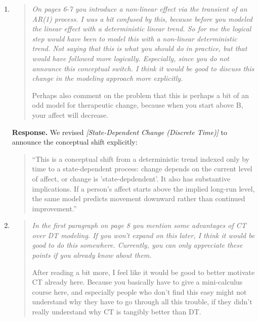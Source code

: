 \documentclass[11pt]{article}
\newcommand{\response}{\textbf{Response.} }
\newcommand{\secit}[1]{\textit{[#1]}}
\newcommand{\msq}[1]{\begin{quote}\small\noindent``#1''\end{quote}}
\newenvironment{reviewerpoint}{\begin{quote}\itshape}{\end{quote}}
\begin{document}
\begin{enumerate}[label=\textbf{Reviewer 1, Minor Point \arabic*.}]
\response We revised the wording in \secit{State-Dependent Change (Discrete Time)} so implications are framed as following from the assumed model:
\msq{By formalizing our linear growth process for Alex and other patients, we can inspect what our assumptions imply.}
\item

\begin{reviewerpoint}
On pages 6-7 you introduce a non-linear effect via the transient of an AR(1) process.
I was a bit confused by this, because before you modeled the linear effect with a deterministic linear trend.
So for me the logical step would have been to model this with a non-linear deterministic trend.
Not saying that this is what you should do in practice, but that would have followed more logically.
Especially, since you do not announce this conceptual switch.
I think it would be good to discuss this change in the modeling approach more explicitly.

Perhaps also comment on the problem that this is perhaps a bit of an odd model for therapeutic change, because when you start above B, your affect will decrease.
\end{reviewerpoint}

\response We revised \secit{State-Dependent Change (Discrete Time)} to announce the conceptual shift explicitly:
\msq{This is a conceptual shift from a deterministic trend indexed only by time to a state-dependent process: change depends on the current level of affect, or change is 'state-depdendent'.
It also has substantive implications.
If a person's affect starts above the implied long-run level, the same model predicts movement downward rather than continued improvement.}
\item

\begin{reviewerpoint}
In the first paragraph on page 8 you mention some advantages of CT over DT modeling.
If you won't expand on this later, I think it would be good to do this somewhere.
Currently, you can only appreciate these points if you already know about them.

After reading a bit more, I feel like it would be good to better motivate CT already here.
Because you basically have to give a mini-calculus course here, and especially people who don't find this easy might not understand why they have to go through all this trouble, if they didn't really understand why CT is tangibly better than DT.
\end{reviewerpoint}


\end{enumerate}
\end{document}
